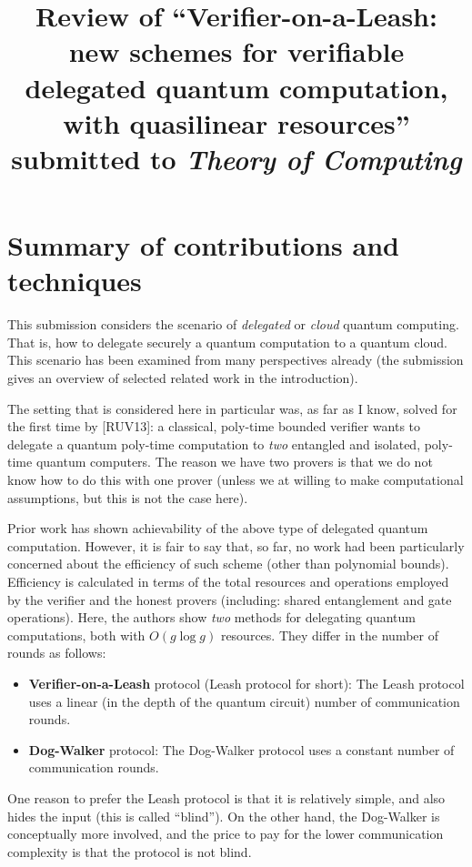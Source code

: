\documentclass[11pt]{article}
\title{Review of ``Verifier-on-a-Leash: new schemes for verifiable delegated quantum
computation, with quasilinear resources''\\
\normalsize submitted to \emph{Theory of Computing}  }
\author{}
\date{}
\newcommand{\DW}{{\sf Dog-Walker }}
\newcommand{\Leash}{{\sf Leash }}
\begin{document}
\maketitle
\section{Summary of contributions and techniques}
\label{sec:summary}

This submission considers the scenario of \emph{delegated} or \emph{cloud} quantum computing. That is, how to delegate securely a quantum computation to a quantum cloud. This scenario has been examined from many perspectives already (the submission gives an overview of selected related work in the introduction).

The setting that is considered here in particular was, as far as I know, solved for the first time by [RUV13]: a classical, poly-time bounded verifier wants to delegate a quantum poly-time computation to \emph{two} entangled and isolated, poly-time quantum computers. The reason we have two provers is that we do not know how to do this with one prover (unless we at willing to make computational assumptions, but this is not the case here).

Prior work has shown achievability of the above type of delegated quantum computation. However, it is fair to say that, so far, no work had been particularly concerned about the efficiency of such scheme (other than polynomial bounds). Efficiency is calculated in terms of the total resources and operations employed by the verifier and the honest provers (including:  shared entanglement and gate operations).
Here, the authors show \emph{two} methods for delegating quantum computations, both with $O(g\log g)$ resources. They differ in the number of rounds as follows:

\begin{itemize}
\item \textbf{Verifier-on-a-Leash} protocol (\Leash protocol for short): The Leash protocol uses a linear (in the depth of the quantum circuit) number of communication rounds.
\item \textbf{Dog-Walker} protocol: The \DW protocol uses a constant number of communication rounds.
\end{itemize}

One reason to prefer the \Leash protocol is that it is relatively simple, and also hides the input (this is called ``blind'').  On the other hand, the \DW is conceptually more involved, and the price to pay for the lower communication complexity is that the protocol is not blind.
\end{document}
